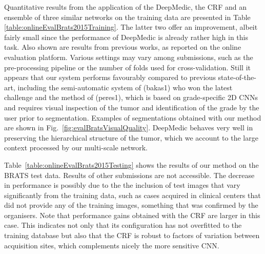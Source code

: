 \documentclass[preprint,authoryear,12pt]{elsarticle}
\begin{document}
Quantitative results from the application of the DeepMedic, the CRF and an ensemble of three similar networks on the training data are presented in Table \ref{table:onlineEvalBrats2015Training}. The latter two offer an improvement, albeit fairly small since the performance of DeepMedic is already rather high in this task. Also shown are results from previous works, as reported on the online evaluation platform. Various settings may vary among submissions, such as the pre-processing pipeline or the number of folds used for cross-validation. Still it appears that our system performs favourably compared to previous state-of-the-art, including the semi-automatic system of \cite{bakas2015Brats} (bakas1) who won the latest challenge and the method of \cite{pereira2015Brats} (peres1), which is based on grade-specific 2D CNNs and requires visual inspection of the tumor and identification of the grade by the user prior to segmentation. Examples of segmentations obtained with our method are shown in Fig.~\ref{fig:evalBratsVisualQuality}. DeepMedic behaves very well in preserving the hierarchical structure of the tumor, which we account to the large context processed by our multi-scale network.



Table~\ref{table:onlineEvalBrats2015Testing} shows the results of our method on the BRATS test data. Results of other submissions are not accessible. The decrease in performance is possibly due to the the inclusion of test images that vary significantly from the training data, such as cases acquired in clinical centers that did not provide any of the training images, something that was confirmed by the organisers. Note that performance gains obtained with the CRF are larger in this case. This indicates not only that its configuration has not overfitted to the training database but also that the CRF is robust to factors of variation between acquisition sites, which complements nicely the more sensitive CNN.
\end{document}
